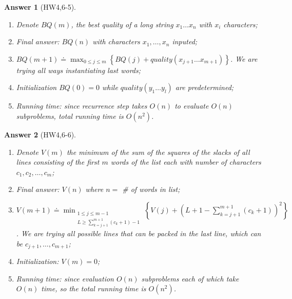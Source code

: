 \documentclass[11pt]{article}
\theoremstyle{numberplain}
\theoremstyle{nonumberplain}
\newtheorem{ans}{Answer}
\newcommand{\dps}{\displaystyle}
\newcommand{\0}{{\mathbf{0}}}
\begin{document}
\begin{ans}[HW4,6-5]
\begin{enumerate}
\item Denote $BQ(m)$, the best quality of a long string $x_1\ldots x_n$ with $x_i$ characters;
\item Final answer: $BQ(n)$ with characters $x_1,\ldots,x_n$ inputed;
\item $\dps BQ(m+1) \doteq \max_{0\leq j\leq m}\left\{BQ(j)+quality(x_{j+1}\ldots x_{m+1}) \right\}$. We are trying all ways instantiating last words;
\item Initialization $BQ(0)=0$ while $quality(y_1\ldots y_l)$ are predetermined;
\item Running time:  since recurrence step takes $O(n)$ to evaluate $O(n)$ subproblems, total running time is $O(n^2)$.
\end{enumerate}
\end{ans}
\begin{ans}[HW4,6-6]
\begin{enumerate}
\item Denote $V(m)$ the minimum of the sum of the squares of the slacks of all lines consisting of the first $m$ words of the list each with number of characters $c_1,c_2,\ldots,c_m$;
\item Final answer: $V(n)$ where $n=$ \# of words in list;
\item $\dps V(m+1) \doteq \min_{ \begin{array}{c}1\leq j\leq m-1 \\ L\geq \sum_{k=j+1}^{m+1}(c_k+1)-1\end{array}
}
\left\{V(j)+\left(L+1-\sum_{k=j+1}^{m+1}(c_k+1)\right)^2 \right\}$. We are trying all possible lines that can be packed in the last line, which can be $c_{j+1},\ldots,c_{m+1}$;
\item Initialization: $V(m)= 0$;
\item Running time:  since evaluation $O(n)$ subproblems each of which take $O(n)$ time, so the total running time is $O(n^2)$.
\end{enumerate}
\end{ans}
\end{document}
